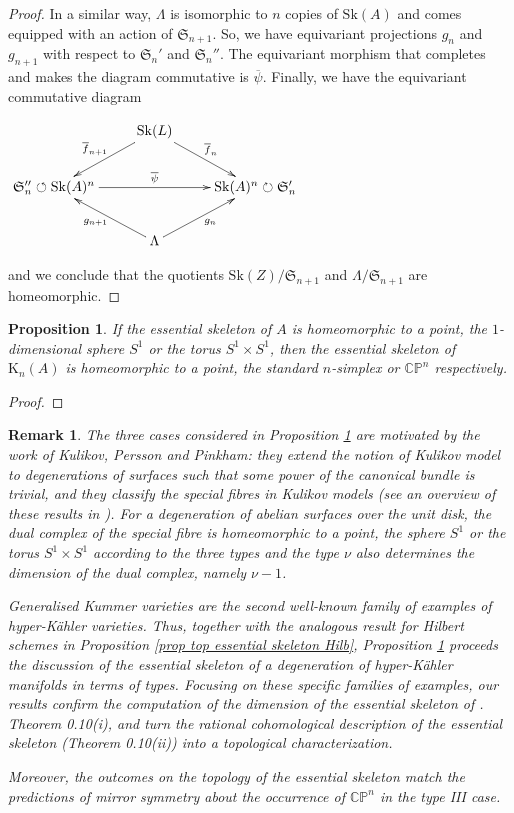 \documentclass{amsart}%
\numberwithin{equation}{subsection}
\theoremstyle{plain2}
\newtheorem{prop}[equation]{Proposition}
\theoremstyle{definition2}
\newtheorem{rem}[equation]{Remark}
\theoremstyle{stepstyle}
\theoremstyle{point}
\theoremstyle{subpoint}
\newcommand{\CP}{\ensuremath{\mathbb{CP}}}
\newcommand{\Sk}{\mathrm{Sk}}
\begin{document}
\begin{proof}
In a similar way, $\Lambda$ is isomorphic to $n$ copies of $\Sk(A)$ and comes equipped with an action of $\mathfrak{S}_{n+1}$. So, we have equivariant projections $g_n$ and $g_{n+1}$ with respect to $\mathfrak{S}_n'$ and $\mathfrak{S}_n''$. The equivariant morphism that completes and makes the diagram commutative is $\overline{\psi}$. Finally, we have the equivariant commutative diagram
\begin{center}
\xymatrixrowsep{1pc}
\xymatrixrowsep{1pc}
$\xymatrix{
& \Sk(L)  \ar[ld]_{\overline{f}_{n+1}} \ar[rd]^{\overline{f}_{n}}  &\\
\mathfrak{S}_n'' \circlearrowleft\Sk(A)^n  \ar[rr]^{\overline{\psi}}& & \Sk(A)^n\circlearrowright \mathfrak{S}_n' \\
& \Lambda\ar[lu]^{g_{n+1}}\ar[ru]_{g_n} &
}$
\end{center} and we conclude that the quotients $\Sk(Z)/\mathfrak{S}_{n+1}$ and $\Lambda/\mathfrak{S}_{n+1}$ are homeomorphic.
\end{proof}

\begin{prop} \label{prop top essential skeleton Kummer}
If the essential skeleton of $A$ is homeomorphic to a point, the $1$-dimensional sphere $S^1$ or the torus $S^1 \times S^1$, then the essential skeleton of $\text{K}_n(A)$ is homeomorphic to a point, the standard $n$-simplex or $\CP^n$ respectively. 
\end{prop}
\begin{proof}

\end{proof}
\begin{rem}
The three cases considered in Proposition \ref{prop top essential skeleton Kummer} are motivated by the work of Kulikov, Persson and Pinkham: they extend the notion of Kulikov model to degenerations of surfaces such that some power of the canonical bundle is trivial, and they classify the special fibres in Kulikov models (see an overview of these results in \cite{FriedmanMorrison}). For a degeneration of abelian surfaces over the unit disk, the dual complex of the special fibre is homeomorphic to a point, the sphere $S^1$ or the torus $S^1 \times S^1$ according to the three types and the type $\nu$ also determines the dimension of the dual complex, namely $\nu-1$.

Generalised Kummer varieties are the second well-known family of examples of hyper-K\"{a}hler varieties. Thus, together with the analogous result for Hilbert schemes in Proposition \ref{prop top essential skeleton Hilb}, Proposition \ref{prop top essential skeleton Kummer} proceeds the discussion of the essential skeleton of a degeneration of hyper-K\"{a}hler manifolds in terms of types. Focusing on these specific families of examples, our results confirm the computation of the dimension of the essential skeleton of \cite{KollarLazaSaccaEtAl2017}. Theorem 0.10(i), and turn the rational cohomological description of the essential skeleton (Theorem 0.10(ii)) into a topological characterization.

Moreover, the outcomes on the topology of the essential skeleton match the predictions of mirror symmetry about the occurrence of $\CP^n$ in the type III case.
\end{rem}


\end{document}
